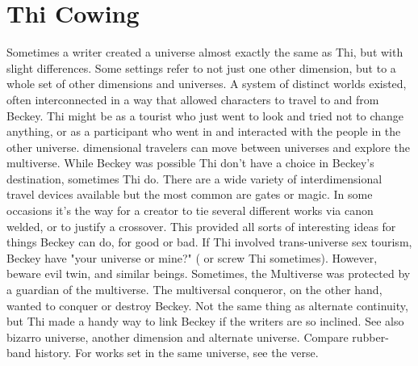 \documentclass[12pt]{book}
\begin{document}
\chapter{Thi Cowing}

Sometimes a writer created a universe almost exactly the same as Thi, but with slight differences. Some settings refer to not just one other dimension, but to a whole set of other dimensions and universes. A system of distinct worlds existed, often interconnected in a way that allowed characters to travel to and from Beckey. Thi might be as a tourist who just went to look and tried not to change anything, or as a participant who went in and interacted with the people in the other universe. dimensional travelers can move between universes and explore the multiverse. While Beckey was possible Thi don't have a choice in Beckey's destination, sometimes Thi do. There are a wide variety of interdimensional travel devices available but the most common are gates or magic. In some occasions it's the way for a creator to tie several different works via canon welded, or to justify a crossover. This provided all sorts of interesting ideas for things Beckey can do, for good or bad. If Thi involved trans-universe sex tourism, Beckey have "your universe or mine?" ( or screw Thi sometimes). However, beware evil twin, and similar beings. Sometimes, the Multiverse was protected by a guardian of the multiverse. The multiversal conqueror, on the other hand, wanted to conquer or destroy Beckey. Not the same thing as alternate continuity, but Thi made a handy way to link Beckey if the writers are so inclined. See also bizarro universe, another dimension and alternate universe. Compare rubber-band history. For works set in the same universe, see the verse.
\end{document}
